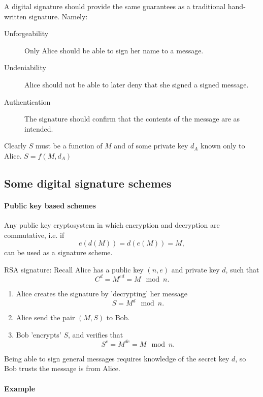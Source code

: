 \documentclass[a4paper, 11pt, openany]{book}
\numberwithin{equation}{section}
\theoremstyle{plain}
\theoremstyle{definition}
\begin{document}
A digital signature should provide the same guarantees as a traditional hand-written signature. Namely:
\begin{description}
\item[Unforgeability] Only Alice should be able to sign her name to a message.

\item[Undeniability] Alice should not be able to later deny that she signed a signed message.

\item[Authentication] The signature should confirm that the contents of the message are as intended.
\end{description}

Clearly $S$ must be a function of $M$ and of some private key $d_A$ known only to Alice. $S = f(M,d_A)$ 


\subsection{Some digital signature schemes}

\paragraph{Public key based schemes}


Any public key cryptosystem in which encryption and decryption are commutative, i.e. if 
\[
    e(d(M)) = d(e(M)) = M,
\]
can be used as a signature scheme. 

RSA signature: Recall Alice has a public key $(n,e)$ and private key $d$, such that    
\[
    C^d = M^{ed} = M \mod n.
\]
\begin{enumerate}
    \item Alice creates the signature by 'decrypting' her message  
    \[
    	S = M^d \mod n.
    \]
    
    \item Alice send the pair $(M,S)$ to Bob.
    
    \item Bob 'encrypts' $S$, and verifies that
    \[
        S^e = M^{de} = M \mod n.
    \]
\end{enumerate}

Being able to sign general messages requires knowledge of the secret key $d$, so Bob trusts the message is from Alice.



\paragraph{Example}
\end{document}
